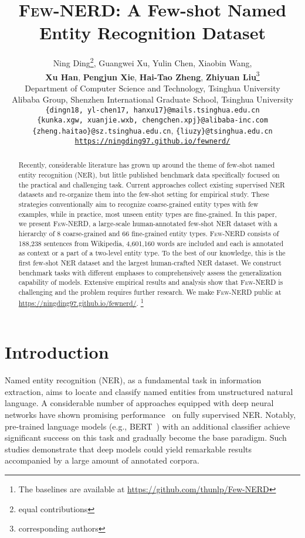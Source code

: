 \documentclass[11pt,a4paper, dvipsnames]{article}
\title{\textsc{Few-NERD}: A Few-shot Named Entity Recognition Dataset}
\author{Ning Ding\thanks{\quad equal contributions}\hspace{0.5em}, Guangwei Xu,  Yulin Chen, {Xiaobin Wang}, \\  \textbf{Xu Han},  \textbf{Pengjun Xie}, \textbf{Hai-Tao Zheng}, \textbf{Zhiyuan Liu}\thanks{\quad corresponding authors}\hspace{0.5em} \\
Department of Computer Science and Technology, Tsinghua University\\ Alibaba Group,
Shenzhen International Graduate School, Tsinghua University \\
\texttt{\{dingn18, yl-chen17, hanxu17\}@mails.tsinghua.edu.cn} \\
\texttt{\{kunka.xgw, xuanjie.wxb, chengchen.xpj\}@alibaba-inc.com} \\
\texttt{\{zheng.haitao\}@sz.tsinghua.edu.cn}, 
\texttt{\{liuzy\}@tsinghua.edu.cn} \\ 
\texttt{\url{https://ningding97.github.io/fewnerd/}}
}
\date{}
\begin{document}
\maketitle
\begin{abstract}



Recently, considerable literature has grown up around the theme of few-shot named entity recognition (NER), but little published benchmark data specifically focused on the practical and challenging task. Current approaches collect existing supervised NER datasets and re-organize them into the few-shot setting for empirical study. These strategies conventionally aim to recognize coarse-grained entity types with few examples, while in practice, most unseen entity types are fine-grained. 
In this paper, we present \textsc{Few-NERD}, a large-scale human-annotated few-shot NER dataset with a hierarchy of 8 coarse-grained and 66 fine-grained entity types.
\textsc{Few-NERD} consists of 188,238 sentences from Wikipedia, 4,601,160 words are included and each is annotated as context or a part of a two-level entity type. 
To the best of our knowledge, this is the first few-shot NER dataset and the largest human-crafted NER dataset. 
We construct benchmark tasks with different emphases to comprehensively assess the generalization capability of models. 
Extensive empirical results and analysis show that \textsc{Few-NERD} is challenging and the problem requires further research. We make \textsc{Few-NERD} public at {\url{https://ningding97.github.io/fewnerd/}}.
 \footnote{The baselines are available at {\url{https://github.com/thunlp/Few-NERD}}}
\end{abstract}

\section{Introduction}

Named entity recognition (NER), as a fundamental task in information extraction, aims to locate and classify named entities from unstructured natural language. 
A considerable number of approaches equipped with deep neural networks have shown promising performance~\cite{chiu2016named} on fully supervised NER. Notably, pre-trained language models (e.g., BERT~\cite{devlin2018bert}) with an additional classifier achieve significant success on this task and gradually become the base paradigm. Such studies demonstrate that deep models could yield remarkable results accompanied by a large amount of annotated corpora.
\end{document}
